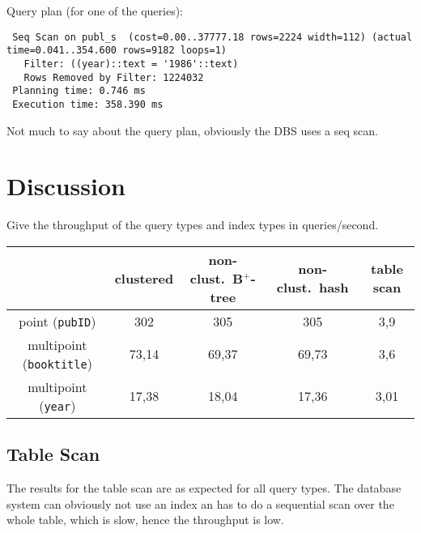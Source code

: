 \documentclass[11pt]{scrartcl}
\begin{document}
\smallskip\noindent
Query plan (for one of the queries):
{\small
\begin{verbatim}
 Seq Scan on publ_s  (cost=0.00..37777.18 rows=2224 width=112) (actual time=0.041..354.600 rows=9182 loops=1)
   Filter: ((year)::text = '1986'::text)
   Rows Removed by Filter: 1224032
 Planning time: 0.746 ms
 Execution time: 358.390 ms
\end{verbatim}
}
Not much to say about the query plan, obviously the DBS uses a seq scan.
\section{Discussion}

Give the throughput of the query types and index types in queries/second.
\begin{center}
  \begin{tabular}{c|c|c|c|c}
    & clustered & non-clust.\ B$^+$-tree & non-clust.\ hash & table scan \\
    \hline
    point ({\tt pubID}) & 302 & 305 & 305 & 3,9 \\
    \hline
    multipoint ({\tt booktitle}) & 73,14 & 69,37 & 69,73 & 3,6\\
    \hline
    multipoint  ({\tt year}) & 17,38 & 18,04 & 17,36 & 3,01 \\  
  \end{tabular}
\end{center}

\medskip

\subsection{Table Scan}
The results for the table scan are as expected for all query types. The database system can obviously not use an index an has to do a sequential scan over the whole table, which is slow, hence the throughput is low.
\end{document}
